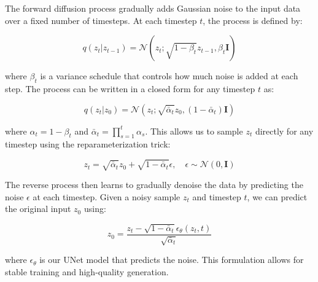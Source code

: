 The forward diffusion process gradually adds Gaussian noise to the input data over a fixed number of timesteps. At each timestep $t$, the process is defined by:

\begin{equation}
    q(z_t|z_{t-1}) = \mathcal{N}(z_t; \sqrt{1-\beta_t}z_{t-1}, \beta_t\mathbf{I})
\end{equation}

\noindent where $\beta_t$ is a variance schedule that controls how much noise is added at each step. The process can be written in a closed form for any timestep $t$ as:

\begin{equation}
    q(z_t|z_0) = \mathcal{N}(z_t; \sqrt{\bar{\alpha}_t}z_0, (1-\bar{\alpha}_t)\mathbf{I})
\end{equation}

\noindent where $\alpha_t = 1-\beta_t$ and $\bar{\alpha}_t = \prod_{s=1}^t \alpha_s$. This allows us to sample $z_t$ directly for any timestep using the reparameterization trick:

\begin{equation}
    z_t = \sqrt{\bar{\alpha}_t}z_0 + \sqrt{1-\bar{\alpha}_t}\epsilon, \quad \epsilon \sim \mathcal{N}(0, \mathbf{I})
\end{equation}

The reverse process then learns to gradually denoise the data by predicting the noise $\epsilon$ at each timestep. Given a noisy sample $z_t$ and timestep $t$, we can predict the original input $z_0$ using:

\begin{equation}
    z_0 = \frac{z_t - \sqrt{1-\bar{\alpha}_t}\epsilon_\theta(z_t,t)}{\sqrt{\bar{\alpha}_t}}
\end{equation}

\noindent where $\epsilon_\theta$ is our UNet model that predicts the noise. This formulation allows for stable training and high-quality generation.

